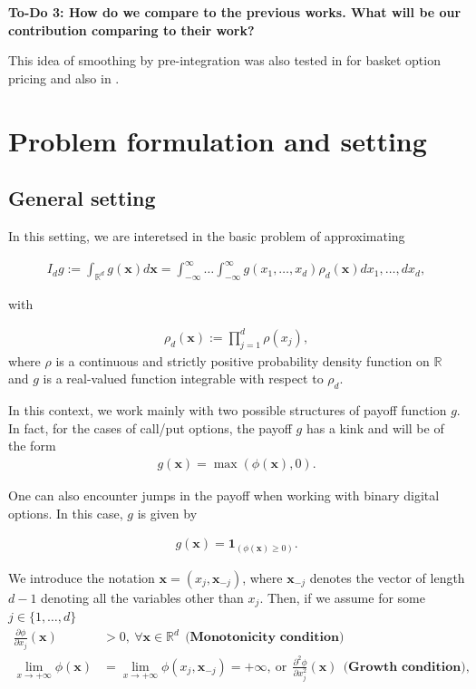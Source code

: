 \documentclass[11pt]{article}
\newcommand{\rset}{\mathbb{R}}
\newcommand{\COMMA}{,}
\begin{document}
\textbf{To-Do 3: How do we compare to the previous works. What will be our contribution comparing to their work?} 

This idea of smoothing by pre-integration was also tested in \cite{bayersmoothing} for basket option pricing and also in \cite{weng2017efficient}.


\section{Problem formulation and setting}
\subsection{General setting}\label{sec:General setting}
In this setting, we are interetsed in the basic problem of approximating

\begin{align}\label{eq:multivariate integral}
I_d g :=\int_{\rset^d}g(\mathbf{x})	d \mathbf{x}= \int_{-\infty}^{\infty} \dots \int_{-\infty}^{\infty} g(x_1,\dots,x_d) \rho_d(\mathbf{x}) dx_1,\dots,dx_d \COMMA
\end{align}


with

\begin{align}
\rho_d(\mathbf{x}):=\prod_{j=1}^{d} \rho(x_j)\COMMA		
\end{align}
where $\rho$ is a continuous and strictly positive probability density function on $\rset$ and $g$ is a real-valued function integrable with respect to $\rho_d$.
 
In this context, we work mainly with two possible structures of payoff function $g$. In fact, for the cases of call/put options, the payoff $g$ has a kink and  will be of the form 
\begin{align}\label{eq:payoffs_with_kink}
g(\mathbf{x})=\max(\phi(\mathbf{x}),0).
\end{align}

One can also encounter jumps in the payoff when working with binary digital options. In this case, $g$ is given by 


\begin{align}\label{eq:payoffs_with_jump}
	g(\mathbf{x})=\mathbf{1}_{(\phi(\mathbf{x}) \ge 0)}.
\end{align}


We introduce the notation $\mathbf{x}=(x_j,\mathbf{x}_{-j})$, where $\mathbf{x}_{-j}$ denotes the vector of length $d-1$ denoting all the variables other than $x_j$. Then, if we assume for some $j \in \{1,\dots,d\}$
\begin{align}
	\frac{\partial \phi}{\partial x_j}(\mathbf{x}) &>0,\: \forall \mathbf{x} \in \rset^d \: \: \textbf{(Monotonicity condition)}  \label{assump:Monotonicity condition}\\
	\underset{x \rightarrow +\infty}{\lim} \phi(\mathbf{x})&=\underset{x \rightarrow +\infty}{\lim} \phi(x_j,\mathbf{x}_{-j})=+\infty, \: \text{or} \:\: \frac{\partial^2 \phi} {\partial x_j^2}(\mathbf{x}) \: \: \textbf{(Growth condition)}  \label{assump:Growth condition} \COMMA
\end{align}
\end{document}

